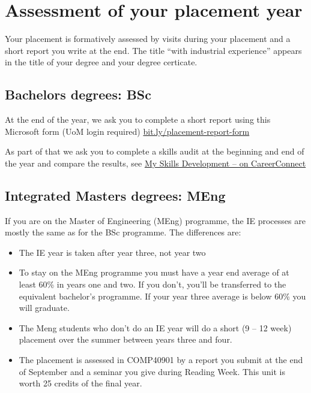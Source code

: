 \documentclass[
]{book}
\providecommand{\tightlist}{%
  \setlength{\itemsep}{0pt}\setlength{\parskip}{0pt}}
\begin{document}
\chapter{Assessment of your placement year}\label{assessment}

Your placement is formatively assessed by visits during your placement and a short report you write at the end. The title ``with industrial experience'' appears in the title of your degree and your degree certicate.

\section{Bachelors degrees: BSc}\label{bsc}

At the end of the year, we ask you to complete a short report using this Microsoft form (UoM login required) \href{https://bit.ly/placement-report-form}{bit.ly/placement-report-form}

As part of that we ask you to complete a skills audit at the beginning and end of the year and compare the results, see \href{https://www.careers.manchester.ac.uk/options/skills/myskills}{My Skills Development -- on CareerConnect} \citep{audit}

\section{Integrated Masters degrees: MEng}\label{meng}

If you are on the Master of Engineering (MEng) programme, the IE processes are mostly the same as for the BSc programme. The differences are:

\begin{itemize}
\tightlist
\item
  The IE year is taken after year three, not year two
\item
  To stay on the MEng programme you must have a year end average of at least 60\% in years one and two. If you don't, you'll be transferred to the equivalent bachelor's programme. If your year three average is below 60\% you will graduate.
\item
  The Meng students who don't do an IE year will do a short (9 -- 12 week) placement over the summer between years three and four.
\item
  The placement is assessed in COMP40901 by a report you submit at the end of September and a seminar you give during Reading Week. This unit is worth 25 credits of the final year.
\end{itemize}
\end{document}
